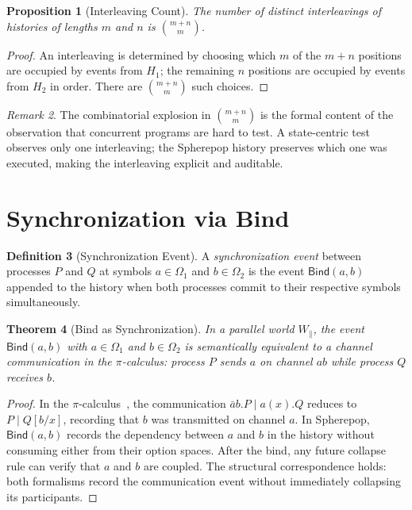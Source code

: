 \documentclass[12pt, a4paper, openany]{book}
\theoremstyle{plain}
\newtheorem{theorem}{Theorem}[chapter]
\newtheorem{proposition}[theorem]{Proposition}
\theoremstyle{definition}
\newtheorem{definition}[theorem]{Definition}
\theoremstyle{remark}
\newtheorem{remark}[theorem]{Remark}
\newcommand{\Bind}{\mathsf{Bind}}
\begin{document}
\begin{proposition}[Interleaving Count]
The number of distinct interleavings of histories of lengths $m$ and $n$ is
$\binom{m+n}{m}$.
\end{proposition}

\begin{proof}
An interleaving is determined by choosing which $m$ of the $m+n$ positions
are occupied by events from $H_1$; the remaining $n$ positions are occupied
by events from $H_2$ in order. There are $\binom{m+n}{m}$ such choices.
\end{proof}

\begin{remark}
The combinatorial explosion in $\binom{m+n}{m}$ is the formal content of the
observation that concurrent programs are hard to test. A state-centric test
observes only one interleaving; the Spherepop history preserves which one was
executed, making the interleaving explicit and auditable.
\end{remark}

\section{Synchronization via Bind}

\begin{definition}[Synchronization Event]
A \emph{synchronization event} between processes $P$ and $Q$ at symbols
$a \in \Omega_1$ and $b \in \Omega_2$ is the event $\Bind(a, b)$ appended to
the history when both processes commit to their respective symbols simultaneously.
\end{definition}

\begin{theorem}[Bind as Synchronization]
In a parallel world $W_\parallel$, the event $\Bind(a, b)$ with $a \in \Omega_1$
and $b \in \Omega_2$ is semantically equivalent to a channel communication in
the $\pi$-calculus: process $P$ sends $a$ on channel $ab$ while process $Q$
receives $b$.
\end{theorem}

\begin{proof}
In the $\pi$-calculus~\cite{milner80}, the communication $\bar{a}b.P \mid a(x).Q$
reduces to $P \mid Q[b/x]$, recording that $b$ was transmitted on channel $a$.
In Spherepop, $\Bind(a, b)$ records the dependency between $a$ and $b$ in the
history without consuming either from their option spaces. After the bind, any
future collapse rule can verify that $a$ and $b$ are coupled. The structural
correspondence holds: both formalisms record the communication event without
immediately collapsing its participants.
\end{proof}
\end{document}
